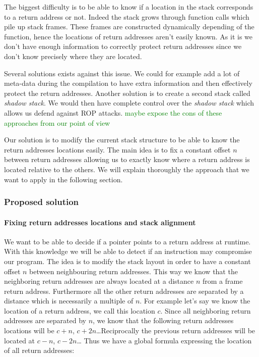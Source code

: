 \documentclass[11pt]{sdm}
\begin{document}
The biggest difficulty is to be able to know if a location in the stack corresponds to a return address or not. Indeed the stack grows through function calls which pile up stack frames. 
These frames are constructed dynamically depending of the function, hence the locations of return addresses aren't easily known. As it is we don't have enough information to correctly protect return addresses since we don't know precisely where they are located.

Several solutions exists against this issue. We could for example add a lot of meta-data during the compilation to have extra information and then effectively protect the return addresses. Another solution is to create a second stack called \textit{shadow stack}. We would then have complete control over the \textit{shadow stack} which allows us defend against ROP attacks.
\textcolor{green}{maybe expose the cons of these approaches from our point of view}

Our solution is to modify the current stack structure to be able to know the return addresses locations easily. The main idea is to fix a constant offset $n$ between return addresses allowing us to exactly know where a return address is located relative to the others. We will explain thoroughly the approach that we want to apply in the following section.

\subsubsection{Proposed solution}

\paragraph{Fixing return addresses locations and stack alignment}
\label{par:Fixing return addresses locations}

We want to be able to decide if a pointer points to a return address at runtime. With this knowledge we will be able to detect if an instruction may compromise our program.
The idea is to modify the stack layout in order to have a constant offset $n$ between neighbouring return addresses. This way we know that the neighboring return addresses are always located at a distance $n$ from a frame return address. Furthermore all the other return addresses are separated by a distance which is necessarily a multiple of $n$.
For example let's say we know the location of a return address, we call this location $c$.
Since all neighboring return addresses are separated by $n$, we know that the following return addresses locations will be $c+n$, $c+2n$\dots Reciprocally the previous return addresses will be located at $c-n$, $c-2n$\dots
Thus we have a global formula expressing the location of all return addresses: 
\end{document}
